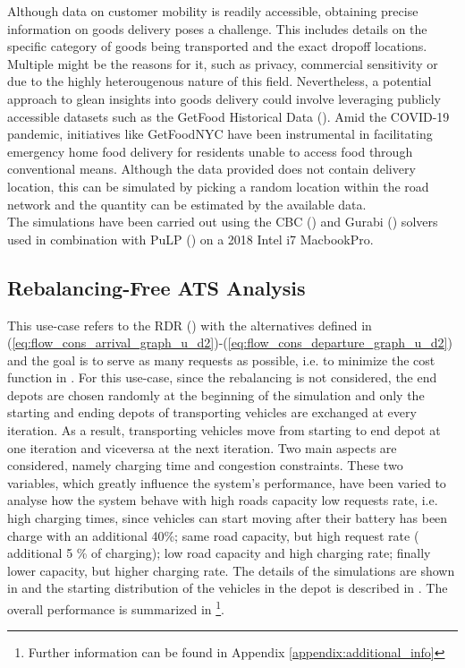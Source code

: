 Although data on customer mobility is readily accessible, obtaining precise information on goods delivery poses a challenge. This includes details on the specific category of goods being transported and the exact dropoff locations. Multiple might be the reasons for it, such as privacy, commercial sensitivity or due to the highly heterougenous nature of this field. Nevertheless, a potential approach to glean insights into goods delivery could involve leveraging publicly accessible datasets such as the GetFood Historical Data (\cite{getfoodnyc}). Amid the COVID-19 pandemic, initiatives like GetFoodNYC have been instrumental in facilitating emergency home food delivery for residents unable to access food through conventional means. Although the data provided does not contain delivery location, this can be simulated by picking a random location within the road network and the quantity can be estimated by the available data.\\
The simulations have been carried out using the CBC (\cite{schumacher2022rcbc}) and Gurabi (\cite{gurobi}) solvers used in combination with PuLP (\cite{dunning2011pulp}) on a 2018 Intel i7 MacbookPro. 


\subsection{Rebalancing-Free ATS Analysis}
This use-case refers to the RDR () with the alternatives defined in (\ref{eq:flow_cons_arrival_graph_u_d2})-(\ref{eq:flow_cons_departure_graph_u_d2}) and the goal is to serve as many requests as possible, i.e. to minimize the cost function in .  For this use-case, since the rebalancing is not considered, the end depots are chosen randomly at the beginning of the simulation and only the starting and ending depots of transporting vehicles are exchanged at every iteration. As a result, transporting vehicles move from starting to end depot at one iteration and viceversa at the next iteration. Two main aspects are considered, namely charging time and congestion constraints. These two variables, which greatly influence the system's performance, have been varied to analyse how the system behave with  high roads capacity low requests rate, i.e. high charging times, since vehicles can start moving after their battery has been charge with an additional 40\%;  same road capacity, but high request rate ( additional 5 \% of charging);  low road capacity and high charging rate; finally  lower capacity, but higher charging rate. 
 The details of the simulations are shown in  and the starting distribution of the vehicles in the depot is described in . The overall performance is summarized in \footnote{Further information can be found in Appendix \ref{appendix:additional_info}
 }.  \\




